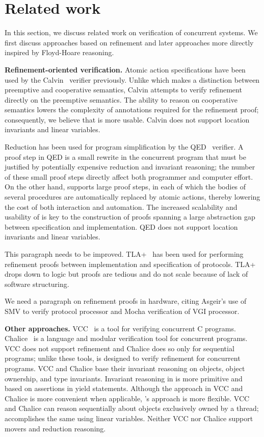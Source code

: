 \section{Related work}
\label{sec:related}

In this section, we discuss related work on verification of concurrent systems.
We first discuss approaches based on refinement and later approaches more directly inspired 
by Floyd-Hoare reasoning.

{\bf Refinement-oriented verification.}
Atomic action specifications have been used by the Calvin~\cite{FlanaganFQS05} verifier previously.
Unlike \civl which makes a distinction between preemptive and cooperative semantics,
Calvin attempts to verify refinement directly on the preemptive semantics.
The ability to reason on cooperative semantics lowers the complexity of annotations 
required for the refinement proof; consequently, we believe that \civl is more usable.
Calvin does not support location invariants and linear variables. 

Reduction has been used for program simplification by the QED~\cite{ElmasQT09} verifier.
A proof step in QED is a small rewrite in the concurrent program
that must be justified by potentially expensive reduction and invariant reasoning;
the number of these small proof steps directly affect both programmer and computer effort.
On the other hand, \civl supports large proof steps, in each of which the bodies of several procedures
are automatically replaced by atomic actions, thereby lowering the cost of both interaction and automation.
The increased scalability and usability of \civl is key to the construction of proofs spanning a large abstraction gap
between specification and implementation.
QED does not support location invariants and linear variables. 

This paragraph needs to be improved.
TLA+~\cite{Lamport} has been used for performing refinement proofs between implementation and specification of protocols.
TLA+ drops down to logic but proofs are tedious and do not scale because of lack of software structuring.

We need a paragraph on refinement proofs in hardware, citing Asgeir's use of SMV to verify protocol processor and Mocha verification of VGI processor.

{\bf Other approaches.}
VCC~\cite{VCC} is a tool for verifying concurrent C programs.  
Chalice~\cite{LM09} is a language and modular verification tool for concurrent programs. 
VCC does not support refinement and Chalice does so only for sequential programs;
unlike these tools, \civl is designed to verify refinement for concurrent programs.  
VCC and Chalice base their invariant reasoning on objects, object ownership, and type invariants. 
Invariant reasoning in \civl is more primitive and based on assertions in yield statements. 
Although the approach in VCC and Chalice is more convenient when applicable, \civl's approach is more flexible. 
VCC and Chalice can reason sequentially about objects exclusively owned by a thread;
\civl accomplishes the same using linear variables.
Neither VCC nor Chalice support movers and reduction reasoning.


